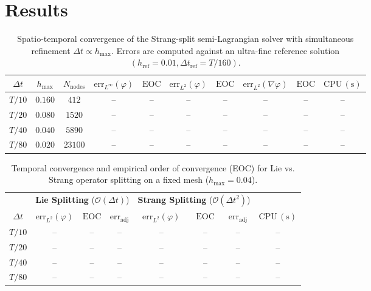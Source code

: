 \documentclass[10pt,a4paper]{article}
\begin{document}
\section{Results}





\begin{table}[htbp]
\centering
\small
\caption{Spatio-temporal convergence of the Strang-split semi-Lagrangian solver with simultaneous refinement $\Delta t \propto h_{\max}$. Errors are computed against an ultra-fine reference solution $(h_{\mathrm{ref}}=0.01, \Delta t_{\mathrm{ref}}=T/160)$.}
\label{tab:convergence_spacetime}
\begin{tabular}{cccccccccc}
\toprule
$\Delta t$ & $h_{\max}$ & $N_{\mathrm{nodes}}$ & $\mathrm{err}_{L^\infty}(\varphi)$ & $\mathrm{EOC}$ & $\mathrm{err}_{L^2}(\varphi)$ & $\mathrm{EOC}$ & $\mathrm{err}_{L^2}(\nabla \varphi)$ & $\mathrm{EOC}$ & $\mathrm{CPU\,(s)}$ \\
\midrule
$T/10$ & $0.160$ & $412$  & -- & -- & -- & -- & -- & -- & -- \\
$T/20$ & $0.080$ & $1520$ & -- & -- & -- & -- & -- & -- & -- \\
$T/40$ & $0.040$ & $5890$ & -- & -- & -- & -- & -- & -- & -- \\
$T/80$ & $0.020$ & $23100$& -- & -- & -- & -- & -- & -- & -- \\
\bottomrule
\end{tabular}
\end{table}


\begin{table}[htbp]
\centering
\small
\caption{Temporal convergence and empirical order of convergence (EOC) for Lie vs. Strang operator splitting on a fixed mesh ($h_{\max} = 0.04$).}
\label{tab:convergence_time}
\begin{tabular}{c|ccc|ccc|c}
\toprule
& \multicolumn{3}{c|}{\textbf{Lie Splitting} ($\mathcal{O}(\Delta t)$)} & \multicolumn{3}{c|}{\textbf{Strang Splitting} ($\mathcal{O}(\Delta t^2)$)} & \\
$\Delta t$ & $\mathrm{err}_{L^2}(\varphi)$ & $\mathrm{EOC}$ & $\mathrm{err}_{\mathrm{adj}}$ & $\mathrm{err}_{L^2}(\varphi)$ & $\mathrm{EOC}$ & $\mathrm{err}_{\mathrm{adj}}$ & $\mathrm{CPU\,(s)}$ \\
\midrule
$T/10$ & -- & -- & -- & -- & -- & -- & -- \\
$T/20$ & -- & -- & -- & -- & -- & -- & -- \\
$T/40$ & -- & -- & -- & -- & -- & -- & -- \\
$T/80$ & -- & -- & -- & -- & -- & -- & -- \\
\bottomrule
\end{tabular}
\end{table}
\end{document}

